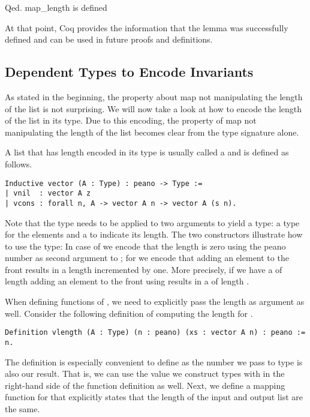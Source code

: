 \begin{cproof}{Qed.}
map_length is defined
\end{cproof}

At that point, Coq provides the information that the lemma  was successfully defined and can be used in future proofs and definitions.

\subsection{Dependent Types to Encode Invariants}

As stated in the beginning, the property about map not manipulating the length of the list is not surprising.
We will now take a look at how to encode the length of the list in its type.
Due to this encoding, the property of map not manipulating the length of the list becomes clear from the type signature alone.

A list that has length encoded in its type is usually called a  and is defined as follows.

\begin{verbatim}
Inductive vector (A : Type) : peano -> Type :=
| vnil  : vector A z
| vcons : forall n, A -> vector A n -> vector A (s n).
\end{verbatim}

Note that the type  needs to be applied to two arguments to yield a type: a type for the elements and a  to indicate its length.
The two constructors illustrate how to use the type: In case of  we encode that the length is zero using the peano number  as second argument to ; for  we encode that adding an element to the front results in a length incremented by one.
More precisely, if we have a  of length  adding an element to the front using  results in a  of length .

When defining functions of , we need to explicitly pass the length as argument as well.
Consider the following definition of computing the length for .

\begin{verbatim}
Definition vlength (A : Type) (n : peano) (xs : vector A n) : peano := n.
\end{verbatim}

The definition is especially convenient to define as the  number  we pass to type  is also our result.
That is, we can use the value we construct types with in the right-hand side of the function definition as well.
Next, we define a mapping function for  that explicitly states that the length of the input and output list are the same.

